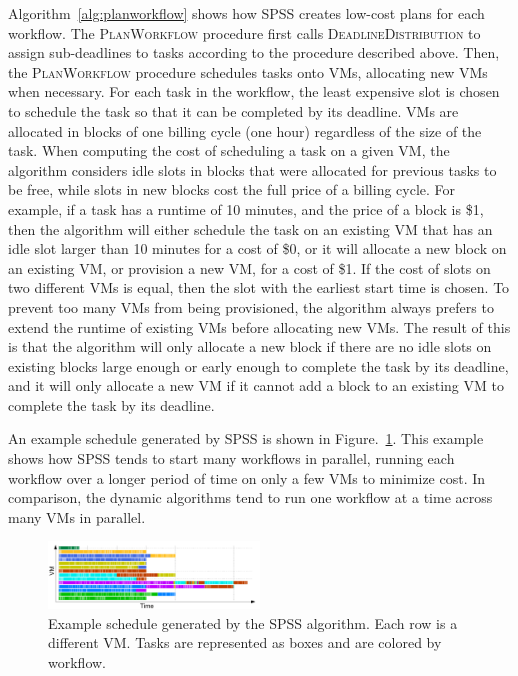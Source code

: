 \documentclass[conference]{IEEEtran}
\begin{document}
Algorithm~\ref{alg:planworkflow} shows how SPSS creates low-cost plans for each workflow. The \textsc{PlanWorkflow} procedure first calls \textsc{DeadlineDistribution} to assign sub-deadlines to tasks according to the procedure described above. Then, the \textsc{PlanWorkflow} procedure schedules tasks onto VMs, allocating new VMs when necessary. For each task in the workflow, the least expensive slot is chosen to schedule the task so that it can be completed by  its deadline. VMs are allocated in blocks of one billing cycle (one hour) regardless of the size of the task. When computing the cost of scheduling a task on a given VM, the algorithm considers idle slots in blocks that were allocated for previous tasks to be free, while slots in new blocks cost the full price of a billing cycle. For example, if a task has a runtime of 10 minutes, and the price of a block is \$1, then the algorithm will either schedule the task on an existing VM that has an idle slot larger than 10 minutes for a cost of \$0, or it will allocate a new block on an existing VM, or provision a new VM, for a cost of \$1. If the cost of slots on two different VMs is equal, then the slot with the earliest start time is chosen. To prevent too many VMs from being provisioned, the algorithm always prefers to extend the runtime of existing VMs before allocating new VMs. The result of this is that the algorithm will only allocate a new block if there are no idle slots on existing blocks large enough or early enough to complete the task by its deadline, and it will only allocate a new VM if it cannot add a block to an existing VM to complete the task by its deadline.

An example schedule generated by SPSS is shown in Figure.~\ref{fig:spss-example}. This example shows how SPSS tends to start many workflows in parallel, running each workflow over a longer period of time on only a few VMs to minimize cost. In comparison, the dynamic algorithms tend to run one workflow at a time across many VMs in parallel.

\begin{figure}[tb] 
  \centering
  \includegraphics[width=0.5\textwidth]{figures/spss-gantt}
  \caption[Example schedule generated by the SPSS algorithm]{Example schedule generated by the SPSS algorithm. Each row is a different VM. Tasks are represented as boxes and are colored by workflow.}
  \label{fig:spss-example}
\end{figure}
\end{document}

